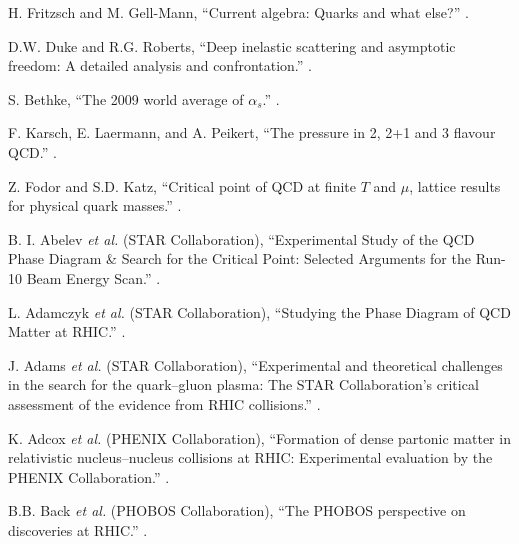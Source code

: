 ﻿%
\begin{thebibliography}{10}

H. Fritzsch and M. Gell-Mann,
\newblock ``Current algebra: Quarks and what else?''
.

D.W. Duke and R.G. Roberts,
\newblock ``Deep inelastic scattering and asymptotic freedom: A detailed analysis and confrontation.''
.

S. Bethke,
\newblock ``The 2009 world average of $\alpha_{s}$.''
.

F. Karsch, E. Laermann, and A. Peikert,
\newblock ``The pressure in 2, 2+1 and 3 ﬂavour QCD.''
.

Z. Fodor and S.D. Katz,
\newblock ``Critical point of QCD at finite $T$ and $\mu$, lattice results for physical quark masses.''
.

B. I. Abelev {\it et al.} (STAR Collaboration),
\newblock ``Experimental Study of the QCD Phase Diagram \& Search for the Critical Point: Selected Arguments for the Run-10 Beam Energy Scan.''
.

L. Adamczyk {\it et al.} (STAR Collaboration),
\newblock ``Studying the Phase Diagram of QCD Matter at RHIC.''
.

J. Adams {\it et al.} (STAR Collaboration),
\newblock ``Experimental and theoretical challenges in the search for the quark–gluon plasma: The STAR Collaboration's critical assessment of the evidence from RHIC collisions.''
.

K. Adcox {\it et al.} (PHENIX Collaboration),
\newblock ``Formation of dense partonic matter in relativistic nucleus–nucleus collisions at RHIC: Experimental evaluation by the PHENIX Collaboration.''
.

B.B. Back {\it et al.} (PHOBOS Collaboration),
\newblock ``The PHOBOS perspective on discoveries at RHIC.''
.


\end{thebibliography}
